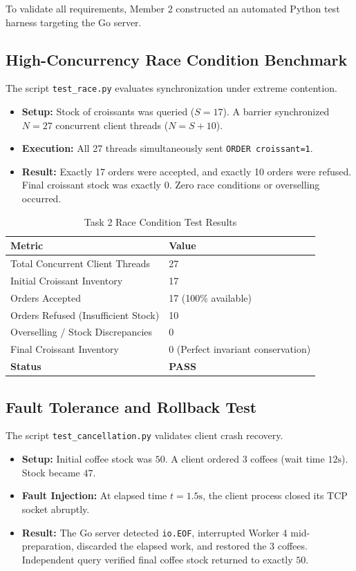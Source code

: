 \documentclass{labreport}
\begin{document}
To validate all requirements, Member 2 constructed an automated Python test harness targeting the Go server.

\subsection{High-Concurrency Race Condition Benchmark}
The script \texttt{test\_race.py} evaluates synchronization under extreme contention. 
\begin{itemize}
    \item \textbf{Setup:} Stock of croissants was queried ($S = 17$). A barrier synchronized $N = 27$ concurrent client threads ($N = S + 10$).
    \item \textbf{Execution:} All 27 threads simultaneously sent \texttt{ORDER croissant=1}.
    \item \textbf{Result:} Exactly 17 orders were accepted, and exactly 10 orders were refused. Final croissant stock was exactly 0. Zero race conditions or overselling occurred.
\end{itemize}

\begin{table}[H]
\centering
\caption{Task 2 Race Condition Test Results}
\label{tab:race}
\begin{tabular}{ll}
\toprule
\textbf{Metric} & \textbf{Value} \\
\midrule
Total Concurrent Client Threads & 27 \\
Initial Croissant Inventory & 17 \\
Orders Accepted & 17 (100\% available) \\
Orders Refused (Insufficient Stock) & 10 \\
Overselling / Stock Discrepancies & 0 \\
Final Croissant Inventory & 0 (Perfect invariant conservation) \\
\textbf{Status} & \textbf{PASS} \\
\bottomrule
\end{tabular}
\end{table}

\subsection{Fault Tolerance and Rollback Test}
The script \texttt{test\_cancellation.py} validates client crash recovery.
\begin{itemize}
    \item \textbf{Setup:} Initial coffee stock was $50$. A client ordered 3 coffees (wait time $12\text{s}$). Stock became $47$.
    \item \textbf{Fault Injection:} At elapsed time $t = 1.5\text{s}$, the client process closed its TCP socket abruptly.
    \item \textbf{Result:} The Go server detected \texttt{io.EOF}, interrupted Worker 4 mid-preparation, discarded the elapsed work, and restored the 3 coffees. Independent query verified final coffee stock returned to exactly $50$.
\end{itemize}
\end{document}
